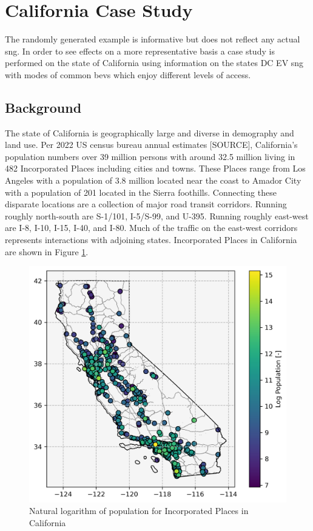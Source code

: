 \section*{California Case Study}

The randomly generated example is informative but does not reflect any actual \gls{sng}. In order to see effects on a more representative basis a case study is performed on the state of California using information on the states DC EV \gls{sng} with modes of common \glspl{bev} which enjoy different levels of access.

\subsection*{Background}

The state of California is geographically large and diverse in demography and land use. Per 2022 US census bureau annual estimates [SOURCE], California's population numbers over 39 million persons with around 32.5 million living in 482 Incorporated Places including cities and towns. These Places range from Los Angeles with a population of 3.8 million located near the coast to Amador City with a population of 201 located in the Sierra foothills. Connecting these disparate locations are a collection of major road transit corridors. Running roughly north-south are S-1/101, I-5/S-99, and U-395. Running roughly east-west are I-8, I-10, I-15, I-40, and I-80. Much of the traffic on the east-west corridors represents interactions with adjoining states. Incorporated Places in California are shown in Figure \ref{fig:california_incorporated_places}.

\begin{figure}[H]
	\centering
	\includegraphics[width = \linewidth]{figs/california_incorporated_places.png}
	\caption{Natural logarithm of population for Incorporated Places in California}
	\label{fig:california_incorporated_places}
\end{figure}

